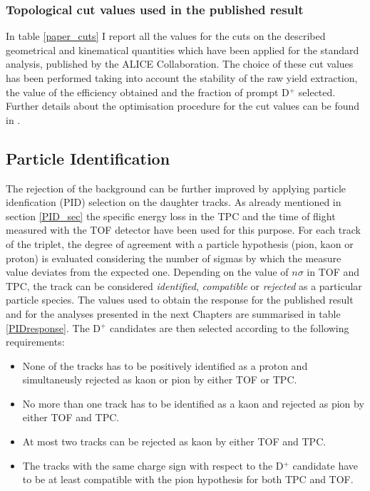 \documentclass[b5paper,10pt,twoside,oldstyle,classica]{toptesi}
\begin{document}
\subsubsection{Topological cut values used in the published result}
In table \ref{paper_cuts} I report all the values for the cuts on the described geometrical and kinematical quantities which have been applied for the standard analysis, published by the ALICE Collaboration. The choice of these cut values has been performed taking into account the stability of the raw yield extraction, the value of the efficiency obtained and the fraction of prompt D$^+$ selected.
Further details about the optimisation procedure for the cut values can be found in \cite{Russo:2015xtz}.
\subsection{Particle Identification}
The rejection of the background can be further improved by applying particle idenfication (PID) selection on the daughter tracks. As already mentioned in section \ref{PID_sec} the specific energy loss in the TPC and the time of flight measured with the TOF detector have been used for this purpose. For each track of the triplet, the degree of agreement with a particle hypothesis (pion, kaon or proton) is evaluated considering the number of sigmas by which the measure value deviates from the expected one. Depending on the value of $n\sigma$ in TOF and TPC, the track can be considered \textit{identified}, \textit{compatible} or \textit{rejected} as a particular particle species. The values used to obtain the response for the published result and for the analyses presented in the next Chapters are summarised in table \ref{PIDresponse}.
The D$^+$ candidates are then selected according to the following requirements:
\begin{itemize}
 \item None of the tracks has to be positively identified as a proton and simultaneusly rejected as kaon or pion by either TOF or TPC.
 \item No more than one track has to be identified as a kaon and rejected as pion by either TOF and TPC.
 \item At most two tracks can be rejected as kaon by either TOF and TPC.
 \item The tracks with the same charge sign with respect to the D$^+$ candidate have to be at least compatible with the pion hypothesis for both TPC and TOF.
 \end{itemize}
\end{document}
